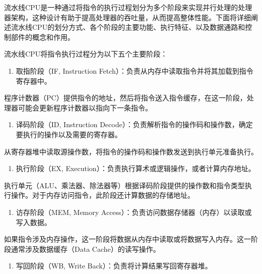 流水线CPU是一种通过将指令的执行过程划分为多个阶段来实现并行处理的处理器架构，这种设计有助于提高处理器的吞吐量，从而提高整体性能。下面将详细阐述流水线CPU的划分方式、各个阶段的主要功能、执行特征、以及数据通路和控制部件的概念和作用。

流水线CPU将指令执行过程分为以下五个主要阶段：

\begin{enumerate}
\def\labelenumi{\arabic{enumi}.}
\tightlist
\item
  取指阶段（IF, Instruction Fetch）：负责从内存中读取指令并将其加载到指令寄存器中。
\end{enumerate}

程序计数器（PC）提供指令的地址，然后将指令送入指令缓存，在这一阶段，处理器可能会更新程序计数器以指向下一条指令。

\begin{enumerate}
\def\labelenumi{\arabic{enumi}.}
\setcounter{enumi}{1}
\tightlist
\item
  译码阶段（ID, Instruction Decode）：负责解析指令的操作码和操作数，确定要执行的操作以及需要的寄存器。
\end{enumerate}

从寄存器堆中读取源操作数，将指令的操作码和操作数发送到执行单元准备执行。

\begin{enumerate}
\def\labelenumi{\arabic{enumi}.}
\setcounter{enumi}{2}
\tightlist
\item
  执行阶段（EX, Execution）：负责执行算术或逻辑操作，或者计算内存地址。
\end{enumerate}

执行单元（ALU、乘法器、除法器等）根据译码阶段提供的操作数和指令类型执行操作。对于内存访问指令，此阶段还计算数据的存储地址。

\begin{enumerate}
\def\labelenumi{\arabic{enumi}.}
\setcounter{enumi}{3}
\tightlist
\item
  访存阶段（MEM, Memory Access）：负责访问数据存储器（内存）以读取或写入数据。
\end{enumerate}

如果指令涉及内存操作，这一阶段将数据从内存中读取或将数据写入内存。这一阶段通常涉及数据缓存（Data Cache）的读写操作。

\begin{enumerate}
\def\labelenumi{\arabic{enumi}.}
\setcounter{enumi}{4}
\tightlist
\item
  写回阶段（WB, Write Back）：负责将计算结果写回寄存器堆。
\end{enumerate}

